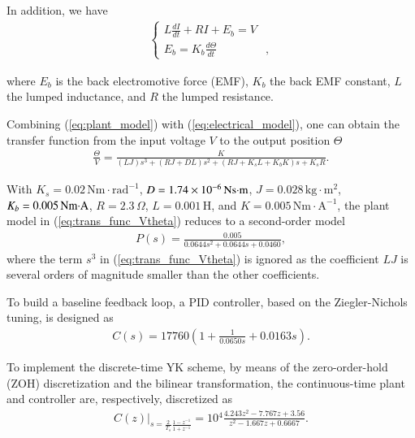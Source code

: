 \documentclass [11pt, proquest] {uwthesis}[2020/02/24]
\begin{document}
In addition, we have
\begin{gather}
\begin{cases}
L\frac{dI}{dt}+RI+E_{b}=V\\
E_{b}=K_{b}\frac{d\varTheta}{dt} & ,
\end{cases}\label{eq:electrical_model}
\end{gather}

\noindent where $E_{b}$ is the back electromotive force (EMF), $K_{b}$
the back EMF constant, $L$ the lumped inductance, and $R$ the lumped resistance.

Combining (\ref{eq:plant_model}) with (\ref{eq:electrical_model}),
one can obtain the transfer function from the input voltage $V$ to
the output position $\varTheta$
\begin{gather}
\frac{\varTheta}{V}=\frac{K}{(LJ)s^{3}+(RJ+DL)s^{2}+(RJ+K_{s}L+K_{b}K)s+K_{s}R}.\label{eq:trans_func_Vtheta}
\end{gather}

With $K_{s}=0.02\,$$\text{Nm}\cdot\text{rad}^{-1}$, $D=1.74\times10^{-6}\,\text{Ns\ensuremath{\cdotp}m}$,
$J=0.028\,$$\text{kg}\cdot\text{m}^{2}$, $K_{b}=0.005\,\text{Nm\ensuremath{\cdotp}A}$,
$R=2.3\,\Omega$, $L=0.001\,\text{H}$, and $K=0.005\,$$\text{Nm}\cdot\text{A}^{-1}$,
the plant model in (\ref{eq:trans_func_Vtheta}) reduces to a second-order
model \cite{keane1994full}
\begin{gather}
P(s)=\frac{0.005}{0.0644s^{2}+0.0644s+0.0460},\label{eq:second_order_plantmodel}
\end{gather}
where the term $s^{3}$ in (\ref{eq:trans_func_Vtheta}) is ignored
as the coefficient $LJ$ is several orders of magnitude smaller than
the other coefficients.

To build a baseline feedback loop, a PID controller, based on the
Ziegler-Nichols tuning, is designed as \cite{ziegler1942optimum}
\begin{gather}
C(s)=17760(1+\frac{1}{0.0650s}+0.0163s).\label{eq:PID controller}
\end{gather}

To implement the discrete-time YK scheme, by means of the zero-order-hold
(ZOH) discretization and the bilinear transformation, the continuous-time
plant and controller are, respectively, discretized as 
\begin{gather}
C(z)|_{s=\frac{2}{T_{s}}\frac{1-z^{-1}}{1+z^{-1}}}=10{}^{4}\frac{4.243z^{2}-7.767z+3.56}{z^{2}-1.667z+0.6667}.\label{eq:discrete_time_C}
\end{gather}
\end{document}
